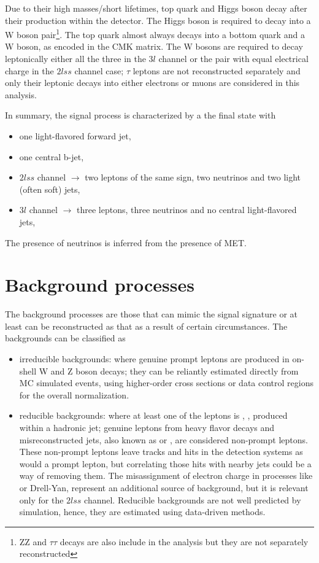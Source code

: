Due to their high masses/short lifetimes, top quark and Higgs boson decay after their production within the detector. The Higgs boson is required to decay into a W boson pair\footnote{ZZ and $\tau\tau$ decays are also include in the analysis but they are not separately reconstructed}. The top quark almost always decays into a bottom quark and a W boson, as encoded in the CMK matrix. The W bosons are required to decay leptonically either all the three in the $3l$ channel or the pair with equal electrical charge in the $2lss$ channel case; $\tau$ leptons are not reconstructed separately and only their leptonic decays into either electrons or muons are considered in this analysis.

In summary, the signal process is characterized by a the final state with

\begin{itemize}
\item one light-flavored forward jet,
\item one central b-jet,
\item $2lss$ channel $\to$ two leptons of the same sign, two neutrinos and two light (often soft) jets,
\item $3l$ channel $\to$ three leptons, three neutrinos and no central light-flavored jets,
\end{itemize}

The presence of neutrinos is inferred from the presence of MET.


\section{Background processes}\label{sec:bg}

The background processes are those that can mimic the signal signature or at least can be reconstructed as that as a result of certain circumstances. The backgrounds can be classified as

\begin{itemize}

\item irreducible backgrounds: where genuine prompt leptons are produced in on-shell W and Z boson decays; they can be reliantly estimated directly from MC simulated events, using higher-order cross sections or data control regions for the overall normalization.

\item reducible backgrounds: where at least one of the leptons is , \ie, produced within a hadronic jet; genuine leptons from heavy flavor decays and misreconstructed jets, also known as  or , are considered non-prompt leptons. These non-prompt leptons leave tracks and hits in the detection systems as would a prompt lepton, but correlating those hits with nearby jets could be a way of removing them. The misassignment of electron charge in processes like \ttbar or Drell-Yan, represent an additional source of background, but it is relevant only for the $2lss$ channel. Reducible backgrounds are not well predicted by simulation, hence, they are estimated using data-driven methods. 
\end{itemize}


